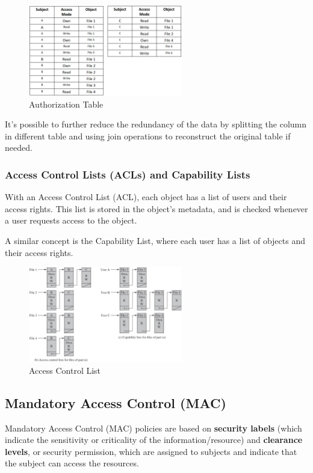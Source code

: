 \begin{figure}[H]
  \centering
  \includegraphics[width=0.6\textwidth]{img/auth table.png}
  \caption{Authorization Table}
  \label{fig:auth-table}
\end{figure}

It's possible to further reduce the redundancy of the data by
splitting the column in different table and using join operations to
reconstruct the original table if needed.

\subsubsection{Access Control Lists (ACLs) and Capability Lists}
With an Access Control List (ACL), each object has a list of users and
their access rights. This list is stored in the object's metadata, and
is checked whenever a user requests access to the object.

A similar concept is the Capability List, where each user has a list
of objects and their access rights.

\begin{figure}[H]
  \centering
  \includegraphics[width=0.6\textwidth]{img/acl.png}
  \caption{Access Control List}
  \label{fig:acl}
\end{figure}

\subsection{Mandatory Access Control (MAC)}
Mandatory Access Control (MAC) policies are based on \textbf{security
labels} (which indicate the sensitivity or criticality of the
information/resource) and \textbf{clearance levels}, or security
permission, which are assigned to subjects and indicate that the
subject can access the resources.

